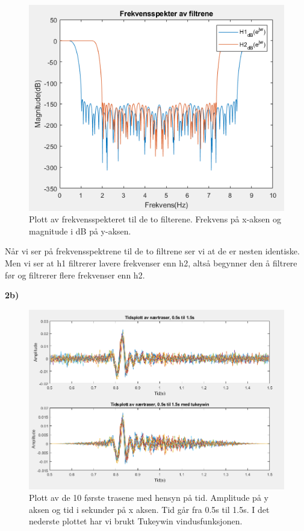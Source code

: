 \documentclass[11pt]{article}
\begin{document}
\begin{figure}[H]
\includegraphics[scale=0.9]{2a_firfrek.png}
\caption{Plott av frekvensspekteret til de to filterene. Frekvens på x-aksen og magnitude i dB på y-aksen.}
\end{figure}

Når vi ser på frekvensspektrene til de to filtrene ser vi at de er nesten identiske. Men vi ser at h1 filtrerer lavere frekvenser enn h2, altså begynner den å filtrere før og filtrerer flere frekvenser enn h2.

\textbf{2b)}
\begin{figure}[H]
\includegraphics[scale=0.67]{2b_nertraser.png}
\caption{Plott av de 10 første trasene med hensyn på tid. Amplitude på y aksen og tid i sekunder på x aksen. Tid går fra 0.5s til 1.5s. I det nederste plottet har vi brukt Tukeywin vindusfunksjonen. }
\end{figure}
\end{document}
